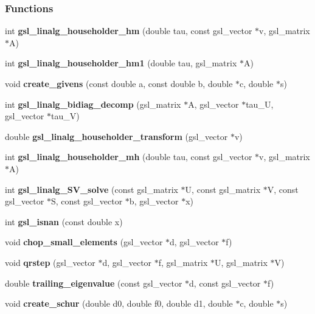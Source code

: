 \subsubsection*{Functions}
\begin{CompactItemize}
\item 
int {\bf gsl\_\-linalg\_\-householder\_\-hm} (double tau, const gsl\_\-vector $\ast$v, gsl\_\-matrix $\ast$A)
\item 
int {\bf gsl\_\-linalg\_\-householder\_\-hm1} (double tau, gsl\_\-matrix $\ast$A)
\item 
void \textbf{create\_\-givens} (const double a, const double b, double $\ast$c, double $\ast$s)\label{group__nr_g2c1eb13f0c90da0f8ef4ef712db29f44}

\item 
int \textbf{gsl\_\-linalg\_\-bidiag\_\-decomp} (gsl\_\-matrix $\ast$A, gsl\_\-vector $\ast$tau\_\-U, gsl\_\-vector $\ast$tau\_\-V)\label{gsl__linalg_8c_deb64588fa4ce379603521437cd70eb0}

\item 
double {\bf gsl\_\-linalg\_\-householder\_\-transform} (gsl\_\-vector $\ast$v)
\item 
int {\bf gsl\_\-linalg\_\-householder\_\-mh} (double tau, const gsl\_\-vector $\ast$v, gsl\_\-matrix $\ast$A)
\item 
int \textbf{gsl\_\-linalg\_\-SV\_\-solve} (const gsl\_\-matrix $\ast$U, const gsl\_\-matrix $\ast$V, const gsl\_\-vector $\ast$S, const gsl\_\-vector $\ast$b, gsl\_\-vector $\ast$x)\label{group__nr_g8568eb30743233bab6e1c2d530829f5f}

\item 
int \textbf{gsl\_\-isnan} (const double x)\label{group__nr_gf37b7182e24399515692cc4aa39722dd}

\item 
void \textbf{chop\_\-small\_\-elements} (gsl\_\-vector $\ast$d, gsl\_\-vector $\ast$f)\label{group__nr_g7a9b4689f2fcd8d6a417a071903df6f1}

\item 
void \textbf{qrstep} (gsl\_\-vector $\ast$d, gsl\_\-vector $\ast$f, gsl\_\-matrix $\ast$U, gsl\_\-matrix $\ast$V)\label{group__nr_g8e5d28fda0cf04d6d70392fa9580c2eb}

\item 
double \textbf{trailing\_\-eigenvalue} (const gsl\_\-vector $\ast$d, const gsl\_\-vector $\ast$f)\label{group__nr_g615603d99ef3bb2a21b32e13761a1474}

\item 
void \textbf{create\_\-schur} (double d0, double f0, double d1, double $\ast$c, double $\ast$s)\label{group__nr_g31a6def59f109d51a7e9af63a8850f0c}


\end{CompactItemize}
